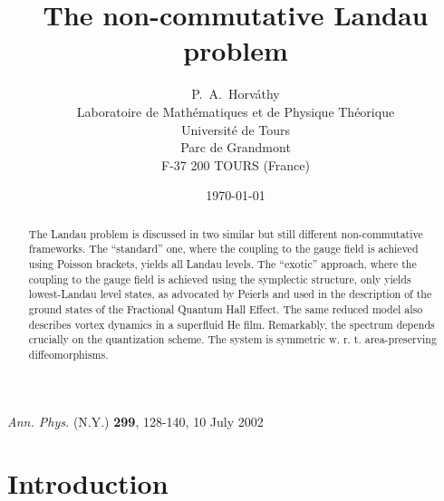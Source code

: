 \documentclass[a4paper,11pt]{article}
\let\ssection=\section
\renewcommand{\section}{\setcounter{equation}{0}\ssection}
\begin{document}
\setlength{\baselineskip}{16pt}

\title{The non-commutative Landau problem\\[8pt]
}
\author{
P.~A.~Horv\'athy
\\
Laboratoire de Math\'ematiques et de Physique Th\'eorique\\
Universit\'e de Tours\\
Parc de Grandmont\\
F-37 200 TOURS (France)
}

\date{\today}

\maketitle


\begin{abstract}
     The Landau problem is discussed in two similar but still different
     non-commuta\-tive frameworks. The ``standard'' one, where the
     coupling to the
     gauge field is achieved using Poisson brackets, yields
     all Landau levels. The  ``exotic'' approach, where the coupling to the
     gauge field is achieved using the symplectic structure,
     only yields lowest-Landau level states,
     as advocated by Peierls and used in
     the description of the ground states of the Fractional Quantum Hall
Effect.
     The same reduced model also describes
     vortex dynamics in a superfluid \coordHE{}He film.
     Remarkably, the spectrum  depends crucially on the quantization
     scheme. The system is symmetric w. r. t. area-preserving diffeomorphisms.
\end{abstract}

\noindent
{\sl Ann. Phys.} (N.Y.) {\bf 299}, 128-140, 10 July 2002

\goodbreak


\section{Introduction}
\end{document}
